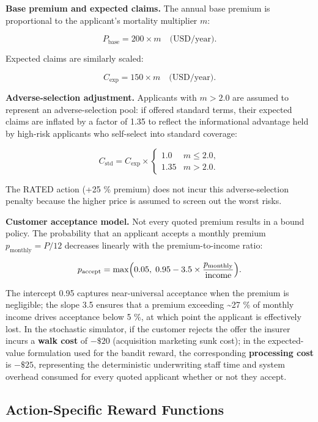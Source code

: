\textbf{Base premium and expected claims.} The annual base premium is proportional to the applicant's mortality multiplier \(m\):

\[P_{\text{base}} = 200 \times m \quad \text{(USD/year)}.\]

Expected claims are similarly scaled:

\[C_{\text{exp}} = 150 \times m \quad \text{(USD/year)}.\]

\textbf{Adverse-selection adjustment.} Applicants with \(m > 2.0\) are assumed to represent an adverse-selection pool: if offered standard terms, their expected claims are inflated by a factor of 1.35 to reflect the informational advantage held by high-risk applicants who self-select into standard coverage:

\[C_{\text{std}} = C_{\text{exp}} \times \begin{cases} 1.0 & m \le 2.0, \\ 1.35 & m > 2.0. \end{cases}\]

The RATED action (+25 \% premium) does not incur this adverse-selection penalty because the higher price is assumed to screen out the worst risks.

\textbf{Customer acceptance model.} Not every quoted premium results in a bound policy. The probability that an applicant accepts a monthly premium \(p_{\text{monthly}} = P / 12\) decreases linearly with the premium-to-income ratio:

\[p_{\text{accept}} = \max\Bigl(0.05,\; 0.95 - 3.5 \times \frac{p_{\text{monthly}}}{\text{income}}\Bigr).\]

The intercept 0.95 captures near-universal acceptance when the premium is negligible; the slope 3.5 ensures that a premium exceeding \textasciitilde27 \% of monthly income drives acceptance below 5 \%, at which point the applicant is effectively lost. In the stochastic simulator, if the customer rejects the offer the insurer incurs a \textbf{walk cost} of \(-\$20\) (acquisition marketing sunk cost); in the expected-value formulation used for the bandit reward, the corresponding \textbf{processing cost} is \(-\$25\), representing the deterministic underwriting staff time and system overhead consumed for every quoted applicant whether or not they accept.

\subsection{Action-Specific Reward Functions}\label{action-specific-reward-functions}

